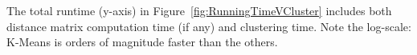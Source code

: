 The total runtime (y-axis) in Figure~\ref{fig:RunningTimeVCluster} 
includes both distance matrix computation time (if any) and clustering time. 
Note the log-scale: K-Means is orders of magnitude faster than the others.




